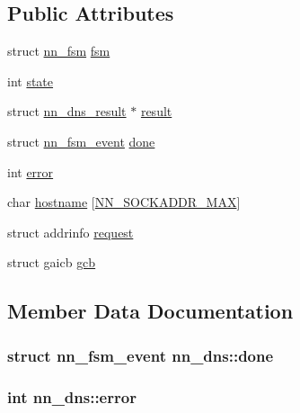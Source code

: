 \subsection*{Public Attributes}
\begin{DoxyCompactItemize}
\item 
struct \hyperlink{structnn__fsm}{nn\+\_\+fsm} \hyperlink{structnn__dns_a0f2f987efe48894f96a30199fbbf08d9}{fsm}
\item 
int \hyperlink{structnn__dns_a95a661cf2fc34d5dcb28bada51eee803}{state}
\item 
struct \hyperlink{structnn__dns__result}{nn\+\_\+dns\+\_\+result} $\ast$ \hyperlink{structnn__dns_a379539bb0b7354a8520acb23fdaac027}{result}
\item 
struct \hyperlink{structnn__fsm__event}{nn\+\_\+fsm\+\_\+event} \hyperlink{structnn__dns_a843e151f44152faf03780cf793842223}{done}
\item 
int \hyperlink{structnn__dns_a17d208ceb0ee12ec77eb91ecbaf21537}{error}
\item 
char \hyperlink{structnn__dns_aa9b2b6de4e2ac1e18876370ada8c8a7a}{hostname} \mbox{[}\hyperlink{nn_8h_a9b3759ef32562c8b4f0c8c75f54c8b03}{N\+N\+\_\+\+S\+O\+C\+K\+A\+D\+D\+R\+\_\+\+M\+AX}\mbox{]}
\item 
struct addrinfo \hyperlink{structnn__dns_aa16cc1ee1b29647de32a28ff2abe9ed3}{request}
\item 
struct gaicb \hyperlink{structnn__dns_ab81aea732ded93810fdf265eb2f257ea}{gcb}
\end{DoxyCompactItemize}


\subsection{Member Data Documentation}
\subsubsection[{done}]{\setlength{\rightskip}{0pt plus 5cm}struct {\bf nn\+\_\+fsm\+\_\+event} nn\+\_\+dns\+::done}\hypertarget{structnn__dns_a843e151f44152faf03780cf793842223}{}\label{structnn__dns_a843e151f44152faf03780cf793842223}
\subsubsection[{error}]{\setlength{\rightskip}{0pt plus 5cm}int nn\+\_\+dns\+::error}\hypertarget{structnn__dns_a17d208ceb0ee12ec77eb91ecbaf21537}{}\label{structnn__dns_a17d208ceb0ee12ec77eb91ecbaf21537}

